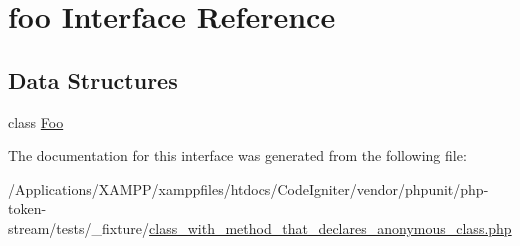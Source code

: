 \hypertarget{interfacefoo}{}\section{foo Interface Reference}
\label{interfacefoo}
\subsection*{Data Structures}
\begin{DoxyCompactItemize}
\item 
class \mbox{\hyperlink{classfoo_1_1_foo}{Foo}}
\end{DoxyCompactItemize}


The documentation for this interface was generated from the following file\+:\begin{DoxyCompactItemize}
\item 
/\+Applications/\+X\+A\+M\+P\+P/xamppfiles/htdocs/\+Code\+Igniter/vendor/phpunit/php-\/token-\/stream/tests/\+\_\+fixture/\mbox{\hyperlink{class__with__method__that__declares__anonymous__class_8php}{class\+\_\+with\+\_\+method\+\_\+that\+\_\+declares\+\_\+anonymous\+\_\+class.\+php}}\end{DoxyCompactItemize}
